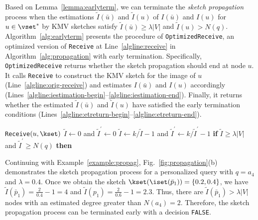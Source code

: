 Based on Lemma~\ref{lemma:earlyterm}, we can terminate the \emph{sketch propagation} process when the estimations $\widetilde{I}(\bar{u})$ and $\widetilde{I}(u)$ of $I(\bar{u})$ and $I(u)$ for $u \in \vset^*$ by KMV sketches satisfy $\widetilde{I}(\bar{u}) \geq \lambda|V|$ and $\widetilde{I}(u) > N(q)$.
Algorithm~\ref{alg:earlyterm} presents the procedure of \texttt{OptimizedReceive}, an optimized version of \texttt{Receive} at Line~\ref{algline:receive} in Algorithm~\ref{alg:propagation} with early termination.
Specifically, \texttt{OptimizedReceive} returns whether the sketch propagation should end at node $u$.
It calls \texttt{Receive} to construct the KMV sketch for the image of $u$ (Line~\ref{algline:orig-receive}) and estimates $I(\bar{u})$ and $I(u)$ accordingly (Lines~\ref{algline:iestimation-begin}--\ref{algline:iestimation-end}).
Finally, it returns whether the estimated $\widetilde{I}(\bar{u})$ and $\widetilde{I}(u)$ have satisfied the early termination conditions (Lines~\ref{algline:etreturn-begin}--\ref{algline:etreturn-end}).

\begin{algorithm}[t]
\caption{{\ttfamily OptimizedReceive}}\label{alg:earlyterm}
\LinesNumbered
{}
    \texttt{Receive}$(u, \kset)$\; \label{algline:orig-receive}
    $\widetilde{I} \gets 0$ and $\widetilde{I}^\prime \gets 0$\; \label{algline:iestimation-begin}
    $\widetilde{I} \gets k/\widetilde{I} - 1$ and $\widetilde{I}^\prime \gets k/\widetilde{I}^\prime - 1$\;\label{algline:iestimation-end}
    \textbf{if} $\widetilde{I} \geq \lambda|V|$ \textnormal{and} $\widetilde{I}^\prime \geq N(q)$ \textbf{then} \;\label{algline:etreturn-begin}
    \; \label{algline:etreturn-end}
\end{algorithm}

\begin{example}
Continuing with Example~\ref{example:propag}, Fig.~\ref{fig:propagation}(b) demonstrates the sketch propagation process for a personalized \ced query with $q=a_4$ and $\lambda=0.4$. Once we obtain the sketch $\kset(\iset(\bar{p}_1))=\{0.2, 0.4\}$, we have $\widetilde{I}(\bar{p}_1)=\frac{2}{0.4}-1=4$ and $\widetilde{I}(p_1)=\frac{2}{0.6}-1=2.3$. Thus, there are $\widetilde{I}(\bar{p}_1)>\lambda|V|$ nodes with an estimated degree greater than $N(a_4)=2$. Therefore, the sketch propagation process can be terminated early with a decision \texttt{FALSE}.
\end{example}

